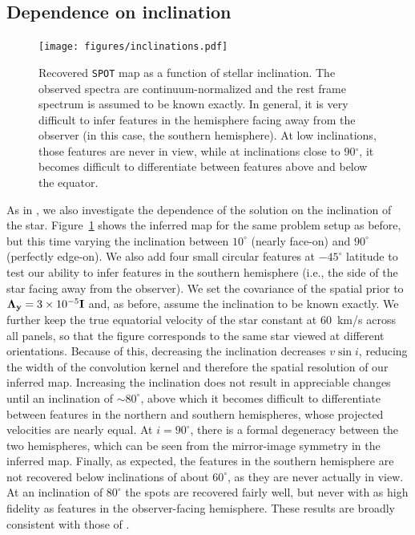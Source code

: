 \documentclass[modern]{aastex631}
\begin{document}
\subsection{Dependence on inclination}
\label{sec:inc}
%
\begin{figure}[t!]
    \begin{centering}
        \texttt{[image: figures/inclinations.pdf]} %
        \caption{%
            Recovered \texttt{SPOT} map as a function of stellar inclination. 
            The observed spectra are continuum-normalized and the rest frame spectrum is assumed to be known exactly.
            In general, it is very difficult to infer features in the hemisphere facing away from the observer (in this case, the southern hemisphere). 
            At low inclinations, those features are never in view, while at inclinations close to 90$^\circ$, it becomes difficult to differentiate between features above and below the equator.
        }
        \label{fig:inclinations}
    \end{centering}
\end{figure}
%
As in \citet{Vogt1987}, we also investigate the dependence of the solution on the inclination of the star.
Figure~\ref{fig:inclinations} shows the inferred map for the same problem setup as before, but this time varying the inclination between $10^\circ$ (nearly face-on) and $90^\circ$ (perfectly edge-on). 
We also add four small circular features at $-45^\circ$ latitude to test our ability to infer features in the southern hemisphere (i.e., the side of the star facing away from the observer).
We set the covariance of the spatial prior to $\boldsymbol{\Lambda}_{\mathbf{y}} = 3\times 10^{-5}{\mathbf{I}}$ and, as before, assume the inclination to be known exactly. 
We further keep the true equatorial velocity of the star constant at $60$~km/s across all panels, so that the figure corresponds to the same star viewed at different orientations. 
Because of this, decreasing the inclination decreases $v\sin i$, reducing the width of the convolution kernel and therefore the spatial resolution of our inferred map.
Increasing the inclination does not result in appreciable changes until an inclination of $\sim 80^\circ$, above which it becomes difficult to differentiate between features in the northern and southern hemispheres, whose projected velocities are nearly equal. 
At $i = 90^\circ$, there is a formal degeneracy between the two hemispheres, which can be seen from the mirror-image symmetry in the inferred map. 
Finally, as expected, the features in the southern hemisphere are not recovered below inclinations of about $60^\circ$, as they are never actually in view. 
At an inclination of $80^\circ$ the spots are recovered fairly well, but never with as high fidelity as features in the observer-facing hemisphere.
These results are broadly consistent with those of \citet{Vogt1987}.
\end{document}
